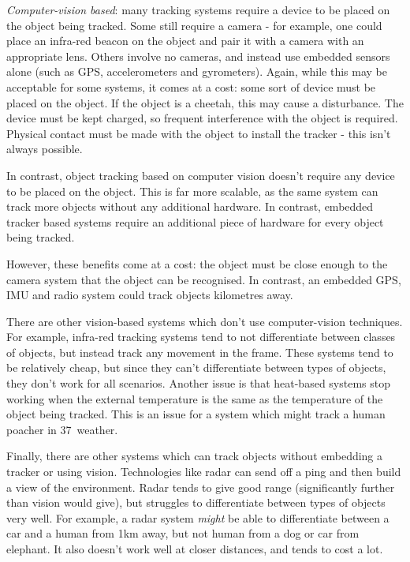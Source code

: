 \textit{Computer-vision based}: many tracking systems require a device to be placed on the object being tracked. Some still require a camera - for example, one could place an infra-red beacon on the object and pair it with a camera with an appropriate lens. Others involve no cameras, and instead use embedded sensors alone (such as GPS, accelerometers and gyrometers). Again, while this may be acceptable for some systems, it comes at a cost: some sort of device must be placed on the object. If the object is a cheetah, this may cause a disturbance. The device must be kept charged, so frequent interference with the object is required. Physical contact must be made with the object to install the tracker - this isn't always possible.

In contrast, object tracking based on computer vision doesn't require any device to be placed on the object. This is far more scalable, as the same system can track more objects without any additional hardware. In contrast, embedded tracker based systems require an additional piece of hardware for every object being tracked.

However, these benefits come at a cost: the object must be close enough to the camera system that the object can be recognised. In contrast, an embedded GPS, IMU and radio system could track objects kilometres away.

There are other vision-based systems which don't use computer-vision techniques. For example, infra-red tracking systems tend to not differentiate between classes of objects, but instead track any movement in the frame. These systems tend to be relatively cheap, but since they can't differentiate between types of objects, they don't work for all scenarios. Another issue is that heat-based systems stop working when the external temperature is the same as the temperature of the object being tracked. This is an issue for a system which might track a human poacher in 37\textdegree\ weather.

Finally, there are other systems which can track objects without embedding a tracker or using vision. Technologies like radar can send off a ping and then build a view of the environment. Radar tends to give good range (significantly further than vision would give), but struggles to differentiate between types of objects very well. For example, a radar system \emph{might} be able to differentiate between a car and a human from 1km away, but not human from a dog or car from elephant. It also doesn't work well at closer distances, and tends to cost a lot.

